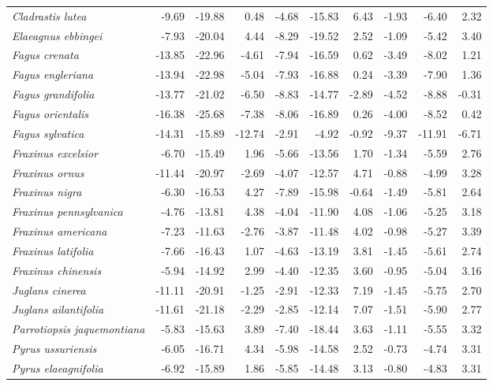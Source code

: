 \documentclass[11pt]{article}
\begin{document}
\begin{longtable}{lrrrrrrrrr}
  \emph{Cladrastis lutea} & -9.69 & -19.88 & 0.48 & -4.68 & -15.83 & 6.43 & -1.93 & -6.40 & 2.32 \\ 
  \emph{Elaeagnus ebbingei} & -7.93 & -20.04 & 4.44 & -8.29 & -19.52 & 2.52 & -1.09 & -5.42 & 3.40 \\ 
  \emph{Fagus crenata} & -13.85 & -22.96 & -4.61 & -7.94 & -16.59 & 0.62 & -3.49 & -8.02 & 1.21 \\ 
  \emph{Fagus engleriana} & -13.94 & -22.98 & -5.04 & -7.93 & -16.88 & 0.24 & -3.39 & -7.90 & 1.36 \\ 
  \emph{Fagus grandifolia} & -13.77 & -21.02 & -6.50 & -8.83 & -14.77 & -2.89 & -4.52 & -8.88 & -0.31 \\ 
  \emph{Fagus orientalis} & -16.38 & -25.68 & -7.38 & -8.06 & -16.89 & 0.26 & -4.00 & -8.52 & 0.42 \\ 
  \emph{Fagus sylvatica} & -14.31 & -15.89 & -12.74 & -2.91 & -4.92 & -0.92 & -9.37 & -11.91 & -6.71 \\ 
  \emph{Fraxinus excelsior} & -6.70 & -15.49 & 1.96 & -5.66 & -13.56 & 1.70 & -1.34 & -5.59 & 2.76 \\ 
  \emph{Fraxinus ornus} & -11.44 & -20.97 & -2.69 & -4.07 & -12.57 & 4.71 & -0.88 & -4.99 & 3.28 \\ 
  \emph{Fraxinus nigra} & -6.30 & -16.53 & 4.27 & -7.89 & -15.98 & -0.64 & -1.49 & -5.81 & 2.64 \\ 
  \emph{Fraxinus pennsylvanica} & -4.76 & -13.81 & 4.38 & -4.04 & -11.90 & 4.08 & -1.06 & -5.25 & 3.18 \\ 
  \emph{Fraxinus americana} & -7.23 & -11.63 & -2.76 & -3.87 & -11.48 & 4.02 & -0.98 & -5.27 & 3.39 \\ 
  \emph{Fraxinus latifolia} & -7.66 & -16.43 & 1.07 & -4.63 & -13.19 & 3.81 & -1.45 & -5.61 & 2.74 \\ 
  \emph{Fraxinus chinensis} & -5.94 & -14.92 & 2.99 & -4.40 & -12.35 & 3.60 & -0.95 & -5.04 & 3.16 \\ 
  \emph{Juglans cinerea} & -11.11 & -20.91 & -1.25 & -2.91 & -12.33 & 7.19 & -1.45 & -5.75 & 2.70 \\ 
  \emph{Juglans ailantifolia} & -11.61 & -21.18 & -2.29 & -2.85 & -12.14 & 7.07 & -1.51 & -5.90 & 2.77 \\ 
  \emph{Parrotiopsis jaquemontiana} & -5.83 & -15.63 & 3.89 & -7.40 & -18.44 & 3.63 & -1.11 & -5.55 & 3.32 \\ 
  \emph{Pyrus ussuriensis} & -6.05 & -16.71 & 4.34 & -5.98 & -14.58 & 2.52 & -0.73 & -4.74 & 3.31 \\ 
  \emph{Pyrus elaeagnifolia} & -6.92 & -15.89 & 1.86 & -5.85 & -14.48 & 3.13 & -0.80 & -4.83 & 3.31 \\ 

\end{longtable}
\end{document}
